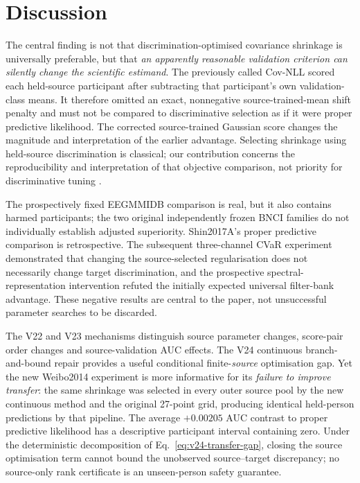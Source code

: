 \documentclass[11pt,a4paper]{article}
\begin{document}
\section{Discussion}
The central finding is not that discrimination-optimised covariance
shrinkage is universally preferable, but that \emph{an apparently
reasonable validation criterion can silently change the scientific
estimand}. The previously called Cov-NLL scored each held-source
participant after subtracting that participant's own validation-class
means. It therefore omitted an exact, nonnegative source-trained-mean
shift penalty and must not be compared to discriminative selection
as if it were proper predictive likelihood. The corrected source-trained
Gaussian score changes the magnitude and interpretation of the earlier
advantage. Selecting shrinkage using held-source discrimination is
classical; our contribution concerns the reproducibility and
interpretation of that objective comparison, not priority for
discriminative tuning \cite{friedman1989,tomioka2010regularized}.

The prospectively fixed EEGMMIDB comparison is real, but it also
contains harmed participants; the two original independently frozen
BNCI families do not individually establish adjusted superiority.
Shin2017A's proper predictive comparison is retrospective.
The subsequent three-channel CVaR experiment demonstrated
that changing the source-selected regularisation does not
necessarily change target discrimination, and the prospective
spectral-representation intervention refuted the initially
expected universal filter-bank advantage. These negative
results are central to the paper, not unsuccessful parameter
searches to be discarded.

The V22 and V23 mechanisms distinguish source parameter changes,
score-pair order changes and source-validation AUC effects.
The V24 continuous branch-and-bound repair provides a useful
conditional finite-\emph{source} optimisation gap. Yet the new
Weibo2014 experiment is more informative for its \emph{failure
to improve transfer}: the same shrinkage was selected
in every outer source pool by the new continuous method
and the original 27-point grid, producing identical
held-person predictions by that pipeline. The average
$+0.00205$ AUC contrast to proper predictive likelihood
has a descriptive participant interval containing zero.
Under the deterministic decomposition of
Eq.~\eqref{eq:v24-transfer-gap}, closing the source
optimisation term cannot bound the unobserved
source--target discrepancy; no source-only rank
certificate is an unseen-person safety guarantee.
\end{document}
